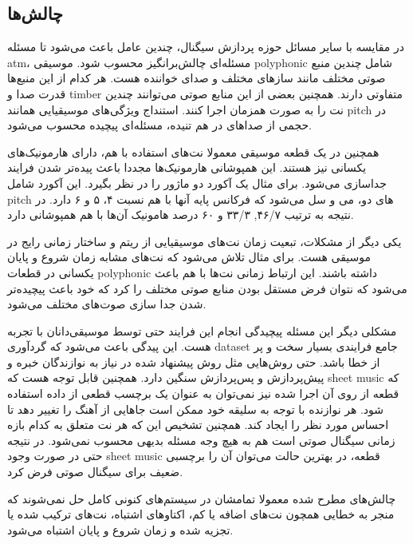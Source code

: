 \subsection{چالش‌ها}
در مقایسه با سایر مسائل حوزه پردازش سیگنال، چندین عامل باعث می‌شود تا مسئله
\gls{atm}، مسئله‌ای چالش‌برانگیز محسوب شود. موسیقی \gls{polyphonic} شامل چندین
منبع صوتی مختلف مانند ساز‌های مختلف و صدای خواننده هست. هر کدام از این منبع‌ها
قدرت صدا و \gls{timber} متفاوتی دارند. همچنین بعضی از این منابع صوتی می‌توانند
چندین نت را به صورت همزمان اجرا کنند. استنداج ویژگی‌های موسیقیایی همانند
\gls{pitch} در حجمی از صداهای در هم تنیده، مسئله‌ای پیچیده محسوب می‌شود.

همچنین در یک قطعه موسیقی معمولا نت‌های استفاده با هم، دارای هارمونیک‌های یکسانی
نیز هستند. این همپوشانی هارمونیک‌ها مجددا باعث پیده‌تر شدن فرایند جداسازی
می‌شود. برای مثال یک آکورد دو ماژور را در نظر بگیرد. این آکورد شامل \gls{pitch}
های دو، می و سل می‌شود که فرکانس پایه آنها با هم نسبت ۴، ۵ و ۶ دارد. در نتیجه به
ترتیب ۴۶/۷, ۳۳/۳ و ۶۰ درصد هامونیک آن‌ها با هم همپوشانی دارد.

یکی دیگر از مشکلات، تبعیت زمان نت‌های موسیقیایی از ریتم و ساختار زمانی رایج در
موسیقی هست. برای مثال تلاش می‌شود که نت‌های مشابه زمان شروع و پایان یکسانی در
قطعات \gls{polyphonic} داشته باشند. این ارتباط زمانی نت‌ها با هم باعث می‌شود که
نتوان فرض مستقل بودن منابع صوتی مختلف را کرد که خود باعث پیچیده‌تر شدن جدا سازی
صوت‌های مختلف می‌شود.

مشکلی دیگر این مسئله پیچیدگی انجام این فرایند حتی توسط موسیقی‌دانان با تجربه
هست. این پیدگی باعث می‌شود که گردآوری \gls{dataset} جامع فرایندی بسیار سخت و پر
از خطا باشد. حتی روش‌هایی مثل روش پیشنهاد شده در \cite{su2015escaping} نیاز به
نوازندگان خبره و پیش‌پردازش و پس‌پردازش سنگین دارد. همچنین قابل توجه هست که
\gls{sheet music} که قطعه از روی آن اجرا شده نیز نمی‌توان به عنوان یک برچسب قطعی
از داده استفاده شود. هر نوازنده با توجه به سلیقه خود ممکن است جاهایی از آهنگ را
تغییر دهد تا احساس مورد نظر را ایجاد کند. همچنین تشخیص این که هر نت متعلق به
کدام بازه زمانی سیگنال صوتی است هم به هیچ وجه مسئله‌ بدیهی محسوب نمی‌شود. در
نتیجه حتی در صورت وجود \gls{sheet music} قطعه، در بهترین حالت می‌توان آن را
برچسبی ضعیف برای سیگنال صوتی فرض کرد.

چالش‌های مطرح شده معمولا تمامشان در سیستم‌های کنونی کامل حل نمی‌شوند که منجر به
خطایی همچون نت‌های اضافه یا کم، اکتاوهای اشتباه، نت‌های ترکیب شده یا تجزیه شده و
زمان شروع و پایان اشتباه می‌شود.